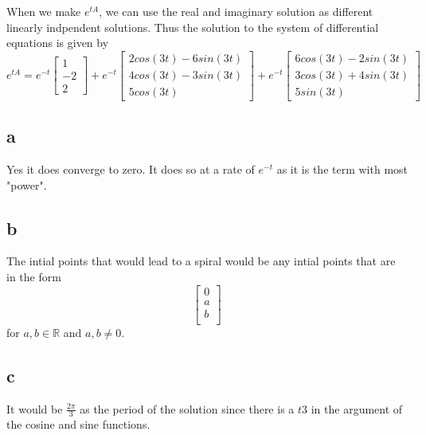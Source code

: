 \documentclass{article}
\begin{document}
When we make $e^{tA}$, we can use the real and imaginary solution as different linearly indpendent solutions. Thus the solution to the system of differential equations is given by
$$e^{tA} = e^{-t}\begin{bmatrix}
    1\\
    -2\\
    2
\end{bmatrix} + e^{-t}\begin{bmatrix}
    2cos(3t) - 6sin(3t)\\
    4cos(3t) - 3sin(3t)\\
    5cos(3t)
\end{bmatrix} + e^{-t}\begin{bmatrix}
    6cos(3t) - 2sin(3t) \\
    3cos(3t) + 4sin(3t)\\
    5sin(3t)
\end{bmatrix}$$
\subsection*{a}
Yes it does converge to zero. It does so at a rate of $e^{-t}$ as it is the term with most "power". 
\subsection*{b}
The intial points that would lead to a spiral would be any intial points that are in the form $$ \begin{bmatrix}
    0 \\
    a\\
    b\\
\end{bmatrix}
$$ for $a,b \in \mathbb{R}$ and $a,b\neq 0$. \
\subsection*{c}
It would be $\frac{2 \pi}{3} $ as the period of the solution since there is a $t3$ in the argument of the cosine and sine functions.
\end{document}
